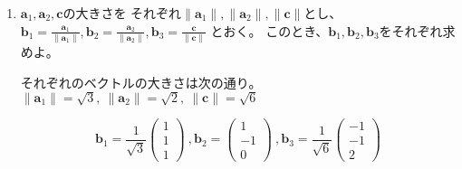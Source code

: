 \documentclass[12pt,b5paper]{ltjsarticle}
\begin{document}
\begin{enumerate}
 \item
      $\bm{a}_1,\bm{a}_2,\bm{c}$の大きさを
      それぞれ$\|\bm{a}_1\|,\|\bm{a}_2\|,\|\bm{c}\|$とし、
      $\displaystyle
      \bm{b}_1=\frac{\bm{a}_1}{\|\bm{a}_1\|},
      \bm{b}_2=\frac{\bm{a}_2}{\|\bm{a}_2\|},
      \bm{b}_3=\frac{\bm{c}}{\|\bm{c}\|}$
      とおく。
      このとき、$\bm{b}_1,\bm{b}_2,\bm{b}_3$をそれぞれ求めよ。

      \dotfill

      それぞれのベクトルの大きさは次の通り。
      $\|\bm{a}_1\| = \sqrt{3},\ \|\bm{a}_2\|= \sqrt{2},\ \|\bm{c}\| = \sqrt{6}$

      \begin{equation}
        \bm{b}_1=
         \frac{1}{\sqrt{3}}
         \begin{pmatrix}
          1\\1\\1
         \end{pmatrix}
        \ ,\bm{b}_2=
        \begin{pmatrix}
         1 \\ -1 \\ 0
        \end{pmatrix}
        \ ,\bm{b}_3=
        \frac{1}{\sqrt{6}}
        \begin{pmatrix}
         -1\\-1\\2
        \end{pmatrix}
      \end{equation}


      \hrulefill

\end{enumerate}

\hrulefill
\end{document}
